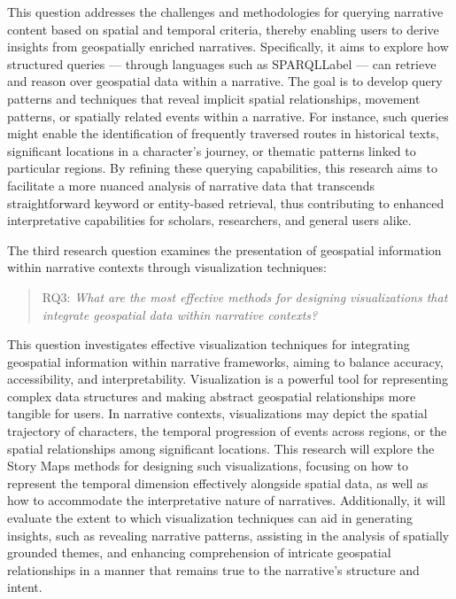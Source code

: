 This question addresses the challenges and methodologies for querying narrative content based on spatial and temporal criteria, thereby enabling users to derive insights from geospatially enriched narratives. Specifically, it aims to explore how structured queries — through languages such as \acrshort{SPARQLLabel} — can retrieve and reason over geospatial data within a narrative. The goal is to develop query patterns and techniques that reveal implicit spatial relationships, movement patterns, or spatially related events within a narrative. For instance, such queries might enable the identification of frequently traversed routes in historical texts, significant locations in a character’s journey, or thematic patterns linked to particular regions. By refining these querying capabilities, this research aims to facilitate a more nuanced analysis of narrative data that transcends straightforward keyword or entity-based retrieval, thus contributing to enhanced interpretative capabilities for scholars, researchers, and general users alike.

The third research question examines the presentation of geospatial information within narrative contexts through visualization techniques:

\begin{quote}\label{quote:rq3}
RQ3: \emph{What are the most effective methods for designing visualizations that integrate geospatial data within narrative contexts?}
\end{quote}

This question investigates effective visualization techniques for integrating geospatial information within narrative frameworks, aiming to balance accuracy, accessibility, and interpretability. Visualization is a powerful tool for representing complex data structures and making abstract geospatial relationships more tangible for users. In narrative contexts, visualizations may depict the spatial trajectory of characters, the temporal progression of events across regions, or the spatial relationships among significant locations. This research will explore the Story Maps methods for designing such visualizations, focusing on how to represent the temporal dimension effectively alongside spatial data, as well as how to accommodate the interpretative nature of narratives. Additionally, it will evaluate the extent to which visualization techniques can aid in generating insights, such as revealing narrative patterns, assisting in the analysis of spatially grounded themes, and enhancing comprehension of intricate geospatial relationships in a manner that remains true to the narrative’s structure and intent.

